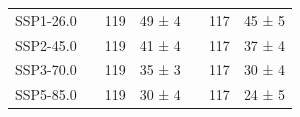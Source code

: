 \begin{table}[htp]
\begin{tabular}{@{}llcclcc@{}}
            SSP1-26.0 & \phantom{a} & 119 & 49 ± 4 & \phantom{a} & 117 & 45 ± 5\\
            SSP2-45.0 & \phantom{a} & 119 & 41 ± 4 & \phantom{a} & 117 & 37 ± 4\\
            SSP3-70.0 & \phantom{a} & 119 & 35 ± 3 & \phantom{a} & 117 & 30 ± 4\\
            SSP5-85.0 & \phantom{a} & 119 & 30 ± 4 & \phantom{a} & 117 & 24 ± 5\\
            \bottomrule
          \end{tabular}
        \end{table}

